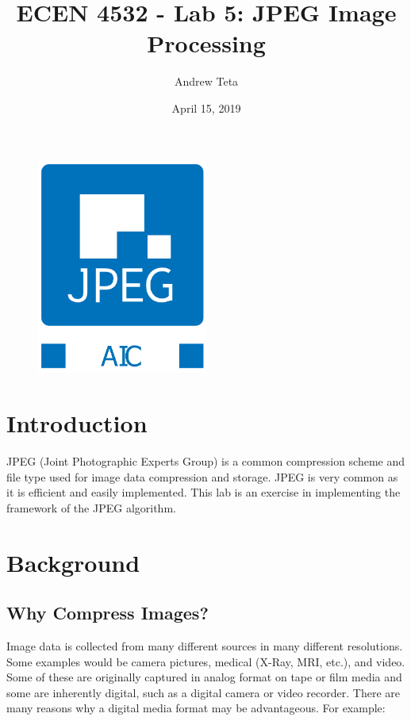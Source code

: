 \documentclass[11pt,a4paper]{article}
\author{Andrew Teta}
\title{ECEN 4532 - Lab 5: JPEG Image Processing}
\date{April 15, 2019}
\begin{document}
\maketitle

\begin{figure}[ht]
	\centering
	\includegraphics[width=0.5\textwidth]{aic-logo}
\end{figure}

\pagebreak

\tableofcontents

\pagebreak

\section{Introduction}
JPEG (Joint Photographic Experts Group) is a common compression scheme and file type used for image data compression and storage. JPEG is very common as it is efficient and easily implemented. This lab is an exercise in implementing the framework of the JPEG algorithm.

\section{Background}
\subsection{Why Compress Images?}
Image data is collected from many different sources in many different resolutions. Some examples would be camera pictures, medical (X-Ray, MRI, etc.), and video. Some of these are originally captured in analog format on tape or film media and some are inherently digital, such as a digital camera or video recorder. There are many reasons why a digital media format may be advantageous. For example:
\end{document}
